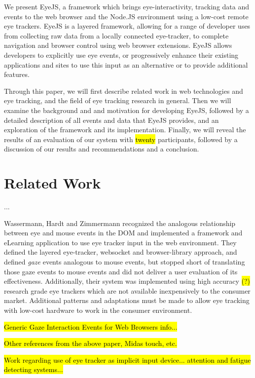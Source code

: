 \documentclass{sigchi}
\begin{document}
We present EyeJS, a framework which brings eye-interactivity, tracking data and events to the web browser and the Node.JS environment using a low-cost remote eye trackers. EyeJS is a layered framework, allowing for a range of developer uses from collecting raw data from a locally connected eye-tracker, to complete navigation and browser control using web browser extensions. EyeJS allows developers to explicitly use eye events, or progressively enhance their existing applications and sites to use this input as an alternative or to provide additional features.

Through this paper, we will first describe related work in web technologies and eye tracking, and the field of eye tracking research in general. Then we will examine the background and and motivation for developing EyeJS, followed by a detailed description of all events and data that EyeJS provides, and an exploration of the framework and its implementation. Finally, we will reveal the results of an evaluation of our system with \hl{twenty} participants, followed by a discussion of our results and recommendations and a conclusion. 



\section{Related Work}

...

Wassermann, Hardt and Zimmermann recognized the analogous relationship between eye and mouse events in the DOM and implemented a framework and eLearning application to use eye tracker input in the web environment. They defined the layered eye-tracker, websocket and browser-library approach, and defined \emph{gaze} events analogous to mouse events, but stopped short of translating those gaze events to mouse events and did not deliver a user evaluation of its effectiveness. Additionally, their system was implemented using high accuracy \hl{(?)} research grade eye trackers which are not available inexpensively to the consumer market. Additional patterns and adaptations must be made to allow eye tracking with low-cost hardware to work in the consumer environment.

\hl{Generic Gaze Interaction Events for Web Browsers info...}

\hl{Other references from the above paper, Midas touch, etc.}

\hl{Work regarding use of eye tracker as implicit input device... attention and fatigue detecting systems...}
\end{document}
